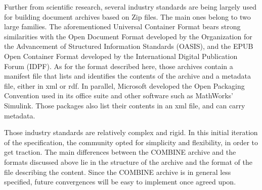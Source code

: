 Further from scientific research, several industry standards are being largely 
used for building document archives based on Zip files. The main ones belong to 
two large families. The aforementioned Universal Container Format bears strong 
similarities with the Open Document Format \citep{ODF} developed by the Organization 
for the Advancement of Structured Information Standards (OASIS), and the EPUB 
Open Container Format  \citep{OCF} developed by the International Digital Publication 
Forum (IDPF). As for the format described here, those archives contain a manifest 
file that lists and identifies the contents of the archive and a metadata file, 
either in xml or rdf. In parallel, Microsoft developed the Open Packaging Convention  \citep{OPC} 
used in its office suite and other software such as MathWorks' Simulink. Those 
packages also list their contents in an xml file, and can carry metadata. 


Those industry standards are relatively complex and rigid. In this initial iteration 
of the specification, the community opted for simplicity and flexibility, in order 
to get traction. The main differences between the COMBINE archive and the formats 
discussed above lie in the structure of the archive and the format of the file 
describing the content. Since the COMBINE archive is in general less specified, 
future convergences will be easy to implement once agreed upon.
